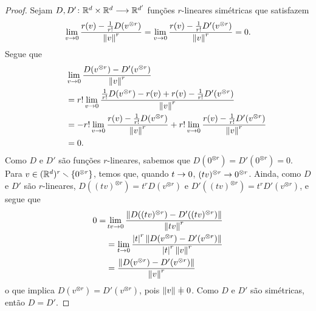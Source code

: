 \begin{proof}
Sejam ${D,D'}\colon {\mathbb{R}^d \times \mathbb{R}^d} \longrightarrow {\mathbb{R}^{d'}}$ funções $r$-lineares simétricas que satisfazem
	\begin{equation*}
	\lim_{v \rightarrow 0} \frac{r(v) - \frac{1}{r!} D(v^{\otimes r})}{\left\Vert{v}\right\Vert^r} = \lim_{v \rightarrow 0} \frac{r(v) - \frac{1}{r!} D'(v^{\otimes r})}{\left\Vert{v}\right\Vert^r} = 0.
	\end{equation*}
Segue que
	\begin{align*}
	&\lim_{v \rightarrow 0} \frac{D(v^{\otimes r}) - D'(v^{\otimes r})}{\left\Vert{v}\right\Vert^r} \\
	\qquad &= r! \lim_{v \rightarrow 0} \frac{\frac{1}{r!} D(v^{\otimes r}) - r(v) + r(v) - \frac{1}{r!} D'(v^{\otimes r})}{\left\Vert{v}\right\Vert^r} \\
	\qquad &= -r!\lim_{v \rightarrow 0} \frac{r(v) - \frac{1}{r!} D(v^{\otimes r})}{\left\Vert{v}\right\Vert^r} + r!\lim_{v \rightarrow 0} \frac{r(v) - \frac{1}{r!} D'(v^{\otimes r})}{\left\Vert{v}\right\Vert^r} \\
	\qquad &= 0.
	\end{align*}
Como $D$ e $D'$ são funções $r$-lineares, sabemos que $D(0^{\otimes r}) = D'(0^{\otimes r}) = 0$. Para $v \in (\mathbb{R}^d)^r \smallsetminus\{0^{\otimes r}\}$, temos que, quando $t \rightarrow 0$, $(tv)^{\otimes r} \rightarrow 0^{\otimes r}$. Ainda, como $D$ e $D'$ são $r$-lineares, $D((tv)^{\otimes r}) = t^r D(v^{\otimes r})$ e $D'((tv)^{\otimes r}) = t^r D'(v^{\otimes r})$, e segue que
	\begin{align*}
	0= &\lim_{tv \rightarrow 0} \frac{\left\Vert{D((tv)^{\otimes r}) - D'((tv)^{\otimes r})}\right\Vert}{\left\Vert{tv}\right\Vert^r} \\
	&= \lim_{t \rightarrow 0} \frac{\left\vert{t}\right\vert^r\left\Vert{D(v^{\otimes r}) - D'(v^{\otimes r})}\right\Vert}{\left\vert{t}\right\vert^r\left\Vert{v}\right\Vert^r} \\
	&= \frac{\left\Vert{D(v^{\otimes r}) - D'(v^{\otimes r})}\right\Vert}{\left\Vert{v}\right\Vert^r}
	\end{align*}
o que implica $D(v^{\otimes r}) = D'(v^{\otimes r})$, pois $\nor{v} \neq 0$. Como $D$ e $D'$ são simétricas, então $D=D'$.
\end{proof}

